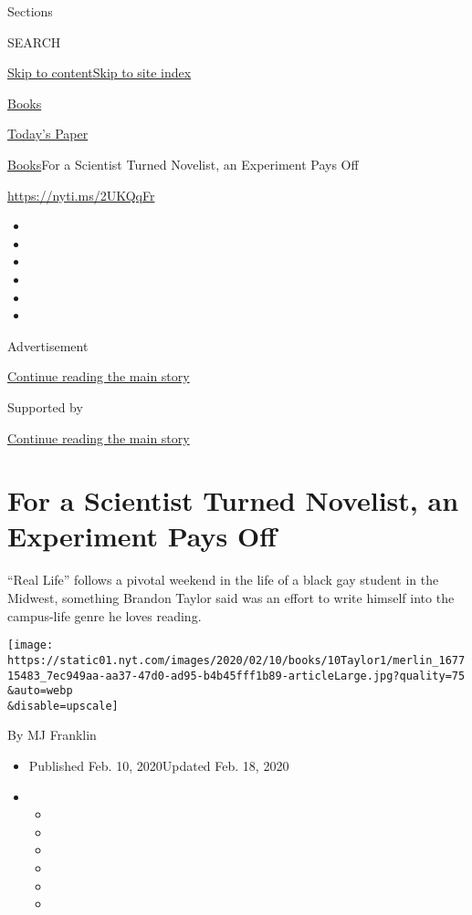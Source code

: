 Sections

SEARCH

\protect\hyperlink{site-content}{Skip to
content}\protect\hyperlink{site-index}{Skip to site index}

\href{https://www.nytimes.com/section/books}{Books}

\href{https://myaccount.nytimes.com/auth/login?response_type=cookie\&client_id=vi}{}

\href{https://www.nytimes.com/section/todayspaper}{Today's Paper}

\href{/section/books}{Books}\textbar{}For a Scientist Turned Novelist,
an Experiment Pays Off

\url{https://nyti.ms/2UKQqFr}

\begin{itemize}
\item
\item
\item
\item
\item
\item
\end{itemize}

Advertisement

\protect\hyperlink{after-top}{Continue reading the main story}

Supported by

\protect\hyperlink{after-sponsor}{Continue reading the main story}

\hypertarget{for-a-scientist-turned-novelist-an-experiment-pays-off}{%
\section{For a Scientist Turned Novelist, an Experiment Pays
Off}\label{for-a-scientist-turned-novelist-an-experiment-pays-off}}

``Real Life'' follows a pivotal weekend in the life of a black gay
student in the Midwest, something Brandon Taylor said was an effort to
write himself into the campus-life genre he loves reading.

\texttt{[image: https://static01.nyt.com/images/2020/02/10/books/10Taylor1/merlin\_167715483\_7ec949aa-aa37-47d0-ad95-b4b45fff1b89-articleLarge.jpg?quality=75\\\&auto=webp\\\&disable=upscale]}

By MJ Franklin

\begin{itemize}
\item
  Published Feb. 10, 2020Updated Feb. 18, 2020
\item
  \begin{itemize}
  \item
  \item
  \item
  \item
  \item
  \item
  \end{itemize}
\end{itemize}

